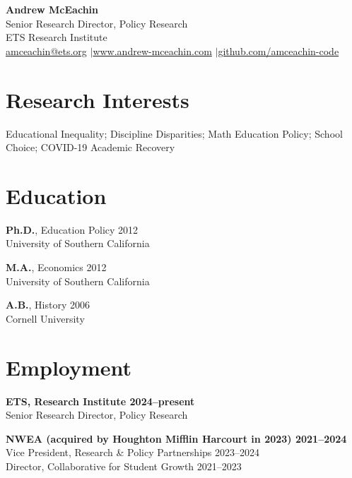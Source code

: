 \documentclass[11pt, letterpaper]{article}
\begin{document}
\thispagestyle{firstpage}

\begin{center}
  {\LARGE\bfseries Andrew McEachin} \\[6pt]
  Senior Research Director, Policy Research \\
  ETS Research Institute \\[4pt]
  {\small \href{mailto:amceachin@ets.org}{amceachin@ets.org}%
  \enspace$\vert$\enspace\href{https://www.andrew-mceachin.com}{www.andrew-mceachin.com}%
  \enspace$\vert$\enspace\href{https://github.com/amceachin-code}{github.com/amceachin-code}%
  }
\end{center}

\vspace{6pt}

\section{Research Interests}
Educational Inequality; Discipline Disparities; Math Education Policy; School Choice; COVID-19 Academic Recovery
\section{Education}
\textbf{Ph.D.}, Education Policy \hfill 2012 \\
University of Southern California

\textbf{M.A.}, Economics \hfill 2012 \\
University of Southern California

\textbf{A.B.}, History \hfill 2006 \\
Cornell University


\section{Employment}
\textbf{ETS, Research Institute \hfill 2024--present \\}
Senior Research Director, Policy Research

\textbf{NWEA (acquired by Houghton Mifflin Harcourt in 2023) \hfill 2021--2024 \\}
Vice President, Research \& Policy Partnerships \hfill 2023--2024 \\
Director, Collaborative for Student Growth \hfill 2021--2023
\end{document}
